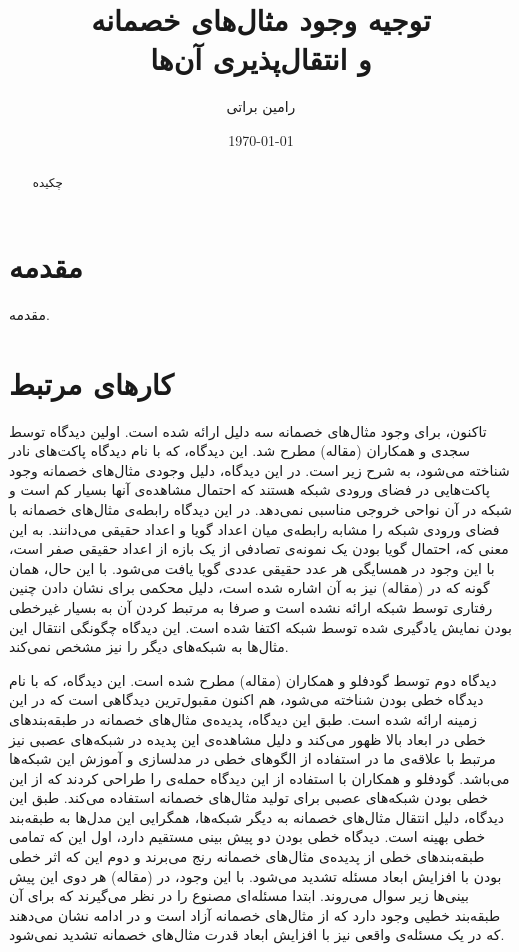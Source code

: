 \documentclass[12pt,onecolumn,a4paper]{article}
\begin{document}
\title{توجیه وجود مثال‌های خصمانه \\ و انتقال‌پذیری آن‌ها} 
\author{رامین براتی}
\date{\today}
\maketitle

\begin{abstract}
چکیده
\end{abstract}

\section{مقدمه} 
مقدمه.

\section{کارهای مرتبط}
تاکنون، برای وجود مثال‌های خصمانه سه دلیل ارائه شده است. اولین دیدگاه توسط سجدی و همکاران
(مقاله)
مطرح شد. این دیدگاه، که با نام دیدگاه پاکت‌های نادر شناخته می‌شود، به شرح زیر است. در این دیدگاه، دلیل وجودی مثال‌های خصمانه وجود پاکت‌هایی در فضای ورودی شبکه هستند که احتمال مشاهده‌ی آنها بسیار کم است و شبکه در آن نواحی خروجی مناسبی نمی‌دهد. در این دیدگاه رابطه‌ی مثال‌های خصمانه با فضای ورودی شبکه را مشابه رابطه‌ی میان اعداد گویا و اعداد حقیقی می‌دانند. به این معنی که، احتمال گویا بودن یک نمونه‌ی تصادفی از یک بازه از اعداد حقیقی صفر است، با این وجود در همسایگی هر عدد حقیقی عددی گویا یافت می‌شود. با این حال،
همان گونه که در
(مقاله)
نیز به آن اشاره شده است، دلیل محکمی برای نشان دادن چنین رفتاری توسط شبکه ارائه نشده است و صرفا به مرتبط کردن آن به بسیار غیرخطی بودن نمایش یادگیری شده توسط شبکه اکتفا شده است. این دیدگاه چگونگی انتقال این مثال‌ها به شبکه‌های دیگر را نیز مشخص نمی‌کند.

دیدگاه دوم توسط گودفلو و همکاران
(مقاله)
مطرح شده است. این دیدگاه، که با نام دیدگاه خطی بودن شناخته می‌شود، هم اکنون مقبول‌ترین دیدگاهی است که در این زمینه ارائه شده است. طبق این دیدگاه، پدیده‌ی مثال‌های خصمانه در طبقه‌بندهای خطی در ابعاد بالا ظهور می‌کند و دلیل مشاهده‌ی این پدیده در شبکه‌های عصبی نیز مرتبط با علاقه‌ی ما در استفاده از الگوهای خطی در مدلسازی و آموزش این شبکه‌ها می‌باشد. گودفلو و همکاران با استفاده از این دیدگاه حمله‌ی
را طراحی کردند که از این خطی بودن شبکه‌های عصبی برای تولید مثال‌های خصمانه استفاده می‌کند. طبق این دیدگاه، دلیل انتقال مثال‌های خصمانه به دیگر شبکه‌ها، همگرایی این مدل‌ها به طبقه‌بند خطی بهینه است. دیدگاه خطی بودن دو پیش بینی مستقیم دارد، اول این که تمامی طبقه‌بندهای خطی از پدیده‌ی مثال‌های خصمانه رنج می‌برند و دوم این که اثر خطی بودن با افزایش ابعاد مسئله تشدید می‌شود. با این وجود، در
(مقاله)
هر دوی این پیش بینی‌ها زیر سوال می‌روند. ابتدا مسئله‌ای  مصنوع را در نظر می‌گیرند که برای آن طبقه‌بند خطیی وجود دارد که از مثال‌های خصمانه آزاد است و در ادامه نشان می‌دهند که در یک مسئله‌ی واقعی نیز با افزایش ابعاد قدرت مثال‌های خصمانه تشدید نمی‌شود.
\end{document}
